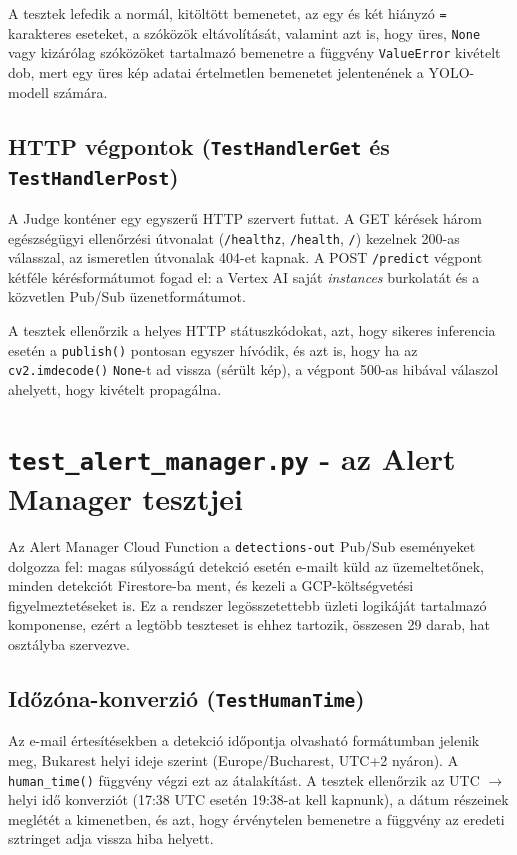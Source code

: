 \documentclass[12pt,a4paper]{article}
\begin{document}
A tesztek lefedik a normál, kitöltött bemenetet, az egy és két hiányzó \texttt{=}
karakteres eseteket, a szóközök eltávolítását, valamint azt is, hogy üres, \texttt{None}
vagy kizárólag szóközöket tartalmazó bemenetre a függvény \texttt{ValueError}
kivételt dob, mert egy üres kép adatai értelmetlen bemenetet jelentenének
a YOLO-modell számára.

\subsection{HTTP végpontok (\texttt{TestHandlerGet} és \texttt{TestHandlerPost})}

A Judge konténer egy egyszerű HTTP szervert futtat. A GET kérések három egészségügyi
ellenőrzési útvonalat (\texttt{/healthz}, \texttt{/health}, \texttt{/}) kezelnek
200-as válasszal, az ismeretlen útvonalak 404-et kapnak. A POST \texttt{/predict}
végpont kétféle kérésformátumot fogad el: a Vertex AI saját \textit{instances}
burkolatát és a közvetlen Pub/Sub üzenetformátumot.

A tesztek ellenőrzik a helyes HTTP státuszkódokat, azt, hogy sikeres inferencia
esetén a \texttt{publish()} pontosan egyszer hívódik, és azt is, hogy ha az
\texttt{cv2.imdecode()} \texttt{None}-t ad vissza (sérült kép), a végpont 500-as
hibával válaszol ahelyett, hogy kivételt propagálna.

\section{\texttt{test\_alert\_manager.py} - az Alert Manager tesztjei}

Az Alert Manager Cloud Function a \texttt{detections-out} Pub/Sub eseményeket
dolgozza fel: magas súlyosságú detekció esetén e-mailt küld az üzemeltetőnek,
minden detekciót Firestore-ba ment, és kezeli a GCP-költségvetési figyelmeztetéseket
is. Ez a rendszer legösszetettebb üzleti logikáját tartalmazó komponense,
ezért a legtöbb teszteset is ehhez tartozik, összesen 29 darab, hat osztályba szervezve.

\subsection{Időzóna-konverzió (\texttt{TestHumanTime})}

Az e-mail értesítésekben a detekció időpontja olvasható formátumban jelenik meg,
Bukarest helyi ideje szerint (Europe/Bucharest, UTC+2 nyáron). A \texttt{human\_time()}
függvény végzi ezt az átalakítást. A tesztek ellenőrzik az UTC $\to$ helyi idő
konverziót (17:38 UTC esetén 19:38-at kell kapnunk), a dátum részeinek meglétét
a kimenetben, és azt, hogy érvénytelen bemenetre a függvény az eredeti sztringet
adja vissza hiba helyett.
\end{document}
